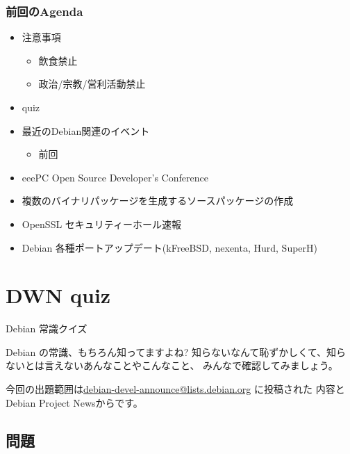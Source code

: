 \documentclass[cjk,dvipdfmx,12pt]{beamer}
\begin{document}
\begin{frame}
 \frametitle{前回のAgenda}
\begin{minipage}[t]{0.45\hsize}
  \begin{itemize}
  \item 注意事項
	\begin{itemize}
	 \item 飲食禁止
	 \item 政治/宗教/営利活動禁止
	\end{itemize}
  \item quiz
  \item 最近のDebian関連のイベント
	\begin{itemize}
	 \item 前回 
	\end{itemize}
 \end{itemize}
\end{minipage} 
\begin{minipage}[t]{0.45\hsize}
 \begin{itemize}
  \item eeePC Open Source Developer's Conference
  \item 複数のバイナリパッケージを生成するソースパッケージの作成
　　\item OpenSSL セキュリティーホール速報
  \item Debian 各種ポートアップデート(kFreeBSD, nexenta, Hurd, SuperH)
 \end{itemize}
\end{minipage}
\end{frame}


\section{DWN quiz}
\begin{frame}{Debian 常識クイズ}

Debian の常識、もちろん知ってますよね?
知らないなんて恥ずかしくて、知らないとは言えないあんなことやこんなこと、
みんなで確認してみましょう。

今回の出題範囲は\url{debian-devel-announce@lists.debian.org} に投稿された
内容とDebian Project Newsからです。

\end{frame}

\subsection{問題}

\end{document}

